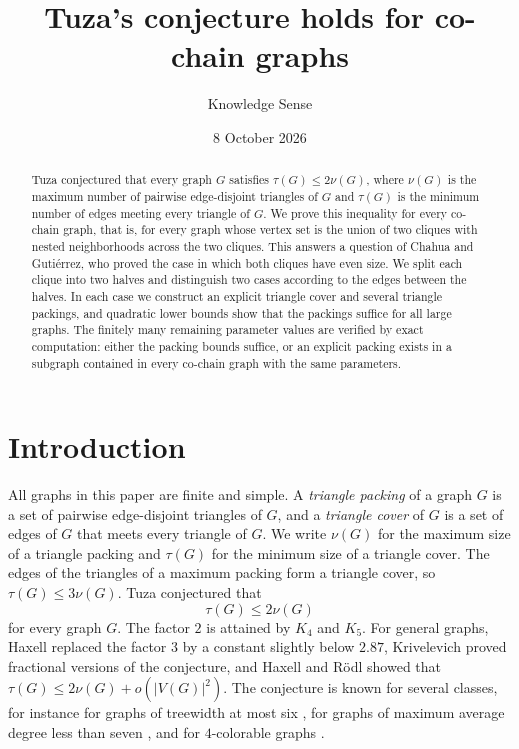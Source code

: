 \documentclass{amsart}
\theoremstyle{definition}
\numberwithin{equation}{section}
\numberwithin{table}{section}
\begin{document}
\title{Tuza's conjecture holds for co-chain graphs}

\author{Knowledge Sense}
\address{Knowledge Sense}

\date{8 October 2026}


\begin{abstract}
Tuza conjectured that every graph $G$ satisfies $\tau(G)\le 2\nu(G)$, where $\nu(G)$ is the maximum number of pairwise edge-disjoint triangles of $G$ and $\tau(G)$ is the minimum number of edges meeting every triangle of $G$. We prove this inequality for every co-chain graph, that is, for every graph whose vertex set is the union of two cliques with nested neighborhoods across the two cliques. This answers a question of Chahua and Guti\'errez, who proved the case in which both cliques have even size. We split each clique into two halves and distinguish two cases according to the edges between the halves. In each case we construct an explicit triangle cover and several triangle packings, and quadratic lower bounds show that the packings suffice for all large graphs. The finitely many remaining parameter values are verified by exact computation: either the packing bounds suffice, or an explicit packing exists in a subgraph contained in every co-chain graph with the same parameters.
\end{abstract}

\maketitle

\section{Introduction}

All graphs in this paper are finite and simple. A \emph{triangle packing} of a graph $G$ is a set of pairwise edge-disjoint triangles of $G$, and a \emph{triangle cover} of $G$ is a set of edges of $G$ that meets every triangle of $G$. We write $\nu(G)$ for the maximum size of a triangle packing and $\tau(G)$ for the minimum size of a triangle cover. The edges of the triangles of a maximum packing form a triangle cover, so $\tau(G)\le 3\nu(G)$. Tuza \cite{Tuz84,Tuz90} conjectured that
\[
\tau(G)\le 2\nu(G)
\]
for every graph $G$. The factor $2$ is attained by $K_4$ and $K_5$. For general graphs, Haxell \cite{Hax99} replaced the factor $3$ by a constant slightly below $2.87$, Krivelevich \cite{Kri95} proved fractional versions of the conjecture, and Haxell and R\"odl \cite{HR01} showed that $\tau(G)\le 2\nu(G)+o(|V(G)|^2)$. The conjecture is known for several classes, for instance for graphs of treewidth at most six \cite{BFG21}, for graphs of maximum average degree less than seven \cite{Pul15}, and for $4$-colorable graphs \cite{ABT12}.
\end{document}
